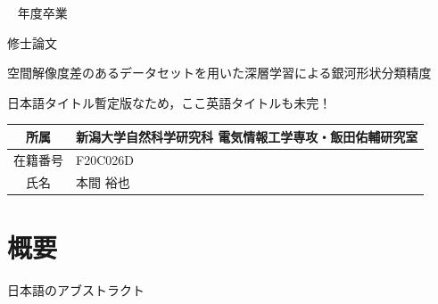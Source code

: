 \documentclass[a4j, 11pt]{jreport}
\newcounter{fiscal_year}         %
\begin{document}
\begin{titlepage}\Large ~
{\normalsize \the\value{fiscal_year} 年度卒業}
\vfill
\begin{center}

{\Huge 修士論文}
\end{center}
\begin{center}

空間解像度差のあるデータセットを用いた深層学習による銀河形状分類精度
\end{center}
\begin{center}

日本語タイトル暫定版なため，ここ英語タイトルも未完！
\end{center}
\vfill
\begin{center}
\begin{tabular}{|c|l|}
\hline

所属 & 新潟大学自然科学研究科 電気情報工学専攻・飯田佑輔研究室 \\
\hline

在籍番号 & F20C026D \\
\hline

氏名 & 本間 裕也 \\
\hline
\end{tabular}
\end{center}
\vspace{1cm}
\vfill
\end{titlepage}
\pagebreak
\addtocounter{page}{1}
\thispagestyle{empty}  %

\chapter*{概要}
日本語のアブストラクト
\end{document}
